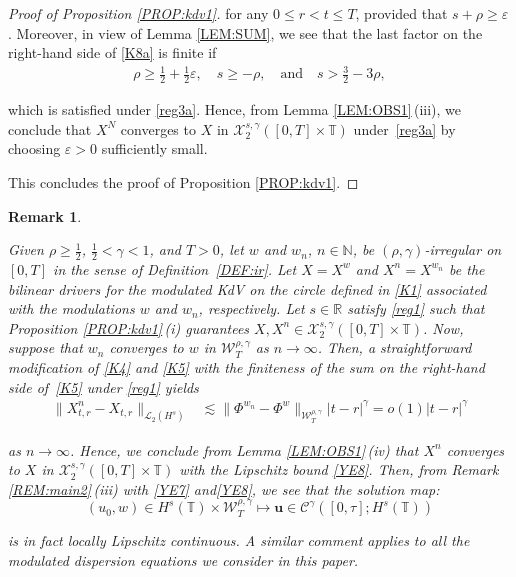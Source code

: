 \documentclass[letterpaper, 11pt,  reqno]{amsart}
\newtheorem{remark}[theorem]{Remark}
\newcommand{\1}{\hspace{0.5mm}\text{I}\hspace{0.5mm}}
\newcommand{\noi}{\noindent}
\newcommand{\R}{\mathbb{R}}
\newcommand{\T}{\mathbb{T}}
\newcommand{\eps}{\varepsilon}
\newcommand{\g}{\gamma}
\newcommand{\les}{\lesssim}
\newcommand{\N}{\mathbb{N}}
\newcommand{\cL}{\mathcal{L}}
\newcommand{\cC}{\mathcal{C}}
\newcommand{\cX}{\mathcal{X}}
\newcommand{\W}{\mathcal{W}}
\newcommand{\uu}{\mathbf{u}}
\numberwithin{equation}{section}
\numberwithin{theorem}{section}
\begin{document}
\begin{proof}[Proof of Proposition \ref{PROP:kdv1}]
\noi
for any $0 \le r <  t \le T$, 
provided that 
 $s + \rho \ge \eps$.
Moreover, 
in view of Lemma \ref{LEM:SUM}, 
we see that the last factor on the right-hand side of \eqref{K8a}
is finite if 
 \begin{align*}
\rho \ge \frac 12 + \frac 12\eps, \quad s \ge - \rho,
\quad \text{and}\quad 
s > \frac 32 - 3 \rho, 
 \end{align*}




\noi
which is satisfied under  \eqref{reg3a}.
Hence,
from  Lemma \ref{LEM:OBS1}\,(iii),  
we conclude that 
$X^N$ converges to $X$ in 
 $  \cX^{s, \g}_2([0, T]\times \T)$ under~\eqref{reg3a}
 by choosing $\eps > 0$ sufficiently small.

This concludes the proof of Proposition \ref{PROP:kdv1}.
\end{proof}




\begin{remark}\label{REM:conv1} \rm

Given $\rho \ge\frac 12$,  $\frac12< \g < 1$, and $T> 0$, 
let  $w$ and $w_n$, $n \in \N$,  be $(\rho,\g)$-irregular on $[0, T]$ in the sense of Definition~\ref{DEF:ir}.
Let $X = X^w$ and $X^n = X^{w_n}$ be 
the   bilinear drivers 
for the modulated KdV on the circle
defined in \eqref{K1}
associated with the modulations $w$ and $w_n$, respectively.
Let  $s \in \R$
satisfy 
\eqref{reg1}
such that Proposition \ref{PROP:kdv1}\,(i) guarantees
$X, X^n \in  \cX^{s, \g}_2([0, T]\times \T)$.
Now,  suppose that $w_n$ converges to $w$ in 
$\W^{\rho,\g}_T$ as $n \to \infty$.
Then, a straightforward  modification of 
\eqref{K4} and \eqref{K5} with the finiteness of the sum
on the right-hand side of~\eqref{K5}
under \eqref{reg1} yields
\begin{align}
\|X^n_{t,r} - X_{t,r} \|_{\cL_2 (H^s)}
&\les
 \| \Phi^{w_n} - \Phi^w \|_{\W_T^{\rho,\g}} 
  |t-r|^{\g}
  = o(1)   |t-r|^{\g}
\label{YE8}
\end{align}

\noi
as $n \to \infty$.
Hence, we conclude from Lemma \ref{LEM:OBS1}\,(iv)
that 
 $X^n$ converges to $X$ 
in $ \cX^{s, \g}_2([0, T] \times \T)$
with the Lipschitz bound \eqref{YE8}.
Then, from Remark \ref{REM:main2}\,(iii)
with \eqref{YE7} and\eqref{YE8}, 
we see that the solution map:
 \[(u_0, w) \in H^s(\T) 
\times  \W^{\rho,\g}_T \longmapsto \uu \in \cC^\g([0, \tau]; H^s(\T))\]

\noi
is in fact locally Lipschitz continuous.
 A similar comment applies
to all the modulated dispersion equations
we consider in this paper.










\end{remark}
\end{document}
